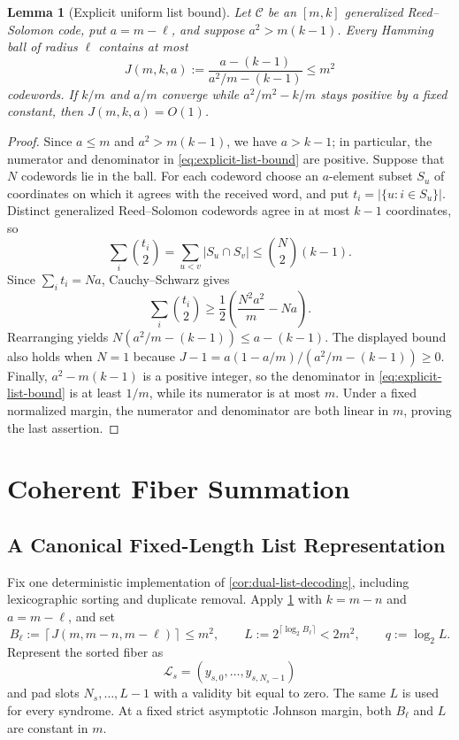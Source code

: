 \documentclass[10pt,a4paper]{amsart}
\newtheorem{lemma}[theorem]{Lemma}
\newcommand{\C}{\mathcal{C}}
\newcommand{\Lcal}{\mathcal{L}}
\newcommand{\abs}[1]{\left\lvert #1\right\rvert}
\begin{document}
\begin{lemma}[Explicit uniform list bound]
\label{lem:explicit-list-bound}
Let $\C$ be an $[m,k]$ generalized Reed--Solomon code, put $a=m-\ell$, and suppose $a^2>m(k-1)$.  Every Hamming ball of radius $\ell$ contains at most
\begin{equation}
   J(m,k,a):=
   \frac{a-(k-1)}{a^2/m-(k-1)}\le m^2
   \label{eq:explicit-list-bound}
\end{equation}
codewords.  If $k/m$ and $a/m$ converge while $a^2/m^2-k/m$ stays positive by a fixed constant, then $J(m,k,a)=O(1)$.
\end{lemma}

\begin{proof}
Since $a\le m$ and $a^2>m(k-1)$, we have $a>k-1$; in particular, the numerator and denominator in \cref{eq:explicit-list-bound} are positive.
Suppose that $N$ codewords lie in the ball.  For each codeword choose an $a$-element subset $S_u$ of coordinates on which it agrees with the received word, and put $t_i=\abs{\{u:i\in S_u\}}$.  Distinct generalized Reed--Solomon codewords agree in at most $k-1$ coordinates, so
\[
   \sum_i\binom{t_i}{2}
   =\sum_{u<v}\abs{S_u\cap S_v}
   \le\binom N2(k-1).
\]
Since $\sum_it_i=Na$, Cauchy--Schwarz gives
\[
   \sum_i\binom{t_i}{2}
   \ge\frac12\left(\frac{N^2a^2}{m}-Na\right).
\]
Rearranging yields
$N(a^2/m-(k-1))\le a-(k-1)$.  The displayed bound also holds when $N=1$ because
$J-1=a(1-a/m)/(a^2/m-(k-1))\ge0$.  Finally, $a^2-m(k-1)$ is a positive integer, so the denominator in \cref{eq:explicit-list-bound} is at least $1/m$, while its numerator is at most $m$.  Under a fixed normalized margin, the numerator and denominator are both linear in $m$, proving the last assertion.
\end{proof}

\section{Coherent Fiber Summation}

\subsection{A Canonical Fixed-Length List Representation}

Fix one deterministic implementation of \cref{cor:dual-list-decoding}, including lexicographic sorting and duplicate removal.  Apply \cref{lem:explicit-list-bound} with $k=m-n$ and $a=m-\ell$, and set
\begin{equation}
   B_\ell:=\left\lceil J(m,m-n,m-\ell)\right\rceil\le m^2,
   \qquad
   L:=2^{\lceil\log_2B_\ell\rceil}<2m^2,
   \qquad q:=\log_2L.
   \label{eq:global-L}
\end{equation}
Represent the sorted fiber as
\[
   \Lcal_s=(y_{s,0},\ldots,y_{s,N_s-1})
\]
and pad slots $N_s,\ldots,L-1$ with a validity bit equal to zero.  The same $L$ is used for every syndrome.  At a fixed strict asymptotic Johnson margin, both $B_\ell$ and $L$ are constant in $m$.
\end{document}
